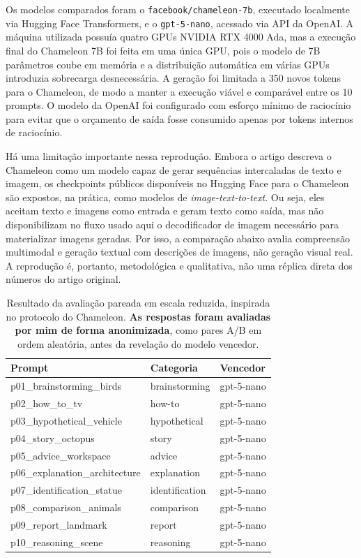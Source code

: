 \documentclass[a4paper,12pt]{article}
\begin{document}
Os modelos comparados foram o \texttt{facebook/chameleon-7b}, executado localmente via Hugging Face Transformers, e o \texttt{gpt-5-nano}, acessado via API da OpenAI. A máquina utilizada possuía quatro GPUs NVIDIA RTX 4000 Ada, mas a execução final do Chameleon 7B foi feita em uma única GPU, pois o modelo de 7B parâmetros coube em memória e a distribuição automática em várias GPUs introduzia sobrecarga desnecessária. A geração foi limitada a 350 novos tokens para o Chameleon, de modo a manter a execução viável e comparável entre os 10 prompts. O modelo da OpenAI foi configurado com esforço mínimo de raciocínio para evitar que o orçamento de saída fosse consumido apenas por tokens internos de raciocínio.

Há uma limitação importante nessa reprodução. Embora o artigo descreva o Chameleon como um modelo capaz de gerar sequências intercaladas de texto e imagem, os checkpoints públicos disponíveis no Hugging Face para o Chameleon são expostos, na prática, como modelos de \textit{image-text-to-text}. Ou seja, eles aceitam texto e imagens como entrada e geram texto como saída, mas não disponibilizam no fluxo usado aqui o decodificador de imagem necessário para materializar imagens geradas. Por isso, a comparação abaixo avalia compreensão multimodal e geração textual com descrições de imagens, não geração visual real. A reprodução é, portanto, metodológica e qualitativa, não uma réplica direta dos números do artigo original.

\begin{table}[htbp]
\centering
\begin{tabular}{lll}
\hline
Prompt & Categoria & Vencedor \\
\hline
p01\_brainstorming\_birds & brainstorming & gpt-5-nano \\
p02\_how\_to\_tv & how-to & gpt-5-nano \\
p03\_hypothetical\_vehicle & hypothetical & gpt-5-nano \\
p04\_story\_octopus & story & gpt-5-nano \\
p05\_advice\_workspace & advice & gpt-5-nano \\
p06\_explanation\_architecture & explanation & gpt-5-nano \\
p07\_identification\_statue & identification & gpt-5-nano \\
p08\_comparison\_animals & comparison & gpt-5-nano \\
p09\_report\_landmark & report & gpt-5-nano \\
p10\_reasoning\_scene & reasoning & gpt-5-nano \\
\hline
\end{tabular}
\caption{Resultado da avaliação pareada em escala reduzida, inspirada no protocolo do Chameleon. \textbf{As respostas foram avaliadas por mim de forma anonimizada}, como pares A/B em ordem aleatória, antes da revelação do modelo vencedor.}
\label{tab:chameleon-mini-eval}
\end{table}
\end{document}
